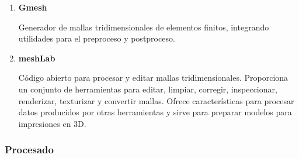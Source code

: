 \begin{enumerate}
\begin{itemize}
\end{itemize}

\item
  \textbf{Gmesh} \cite{geuzaine2009gmsh}

Generador de mallas tridimensionales de elementos finitos, integrando
utilidades para el preproceso y postproceso.

\item
  \textbf{meshLab} \cite{MeshLab}

Código abierto para procesar y editar mallas tridimensionales.
Proporciona un conjunto de herramientas para editar, limpiar, corregir,
inspeccionar, renderizar, texturizar y convertir mallas. Ofrece
características para procesar datos producidos por otras herramientas y
sirve para preparar modelos para impresiones en 3D. 
\end{enumerate}

\subsubsection{Procesado} \label{header-n269}


